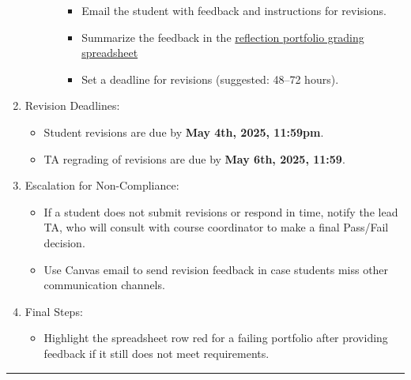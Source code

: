\documentclass[
]{article}
\providecommand{\tightlist}{%
  \setlength{\itemsep}{0pt}\setlength{\parskip}{0pt}}
\begin{document}
\begin{enumerate}
\begin{itemize}
\begin{itemize}
      \begin{itemize}
      \tightlist
      \item
        Email the student with feedback and instructions for revisions.\\
      \item
        Summarize the feedback in the \href{https://docs.google.com/spreadsheets/d/1Svqi-B-zVCOHV6jpabtC8N3SdY7lGWLxTohlPmq__5k/edit?gid=636250357\#gid=636250357}{reflection portfolio grading spreadsheet}\\
      \item
        Set a deadline for revisions (suggested: 48--72 hours).
      \end{itemize}
    \end{itemize}
  \end{itemize}
\item
  Revision Deadlines:

  \begin{itemize}
  \tightlist
  \item
    Student revisions are due by \textbf{May 4th, 2025, 11:59pm}.
  \item
    TA regrading of revisions are due by \textbf{May 6th, 2025, 11:59}.
  \end{itemize}
\item
  Escalation for Non-Compliance:

  \begin{itemize}
  \tightlist
  \item
    If a student does not submit revisions or respond in time, notify the lead TA, who will consult with course coordinator to make a final Pass/Fail decision.\\
  \item
    Use Canvas email to send revision feedback in case students miss other communication channels.
  \end{itemize}
\item
  Final Steps:

  \begin{itemize}
  \tightlist
  \item
    Highlight the spreadsheet row red for a failing portfolio after providing feedback if it still does not meet requirements.
  \end{itemize}
\end{enumerate}

\begin{center}\rule{0.5\linewidth}{0.5pt}\end{center}
\end{document}
